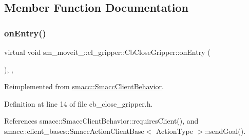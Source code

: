 \subsection{Member Function Documentation}
\mbox{\label{classsm__moveit__2_1_1cl__gripper_1_1CbCloseGripper_aa2b903fc41ba2aecdb00d5f1804cfb75}} 
\subsubsection{\texorpdfstring{on\+Entry()}{onEntry()}}
{\footnotesize\ttfamily virtual void sm\+\_\+moveit\+\_\+::cl\+\_\+gripper\+::\+Cb\+Close\+Gripper\+::on\+Entry (\begin{DoxyParamCaption}{ }\end{DoxyParamCaption})\hspace{0.3cm}{\ttfamily [inline]}, {\ttfamily [override]}, {\ttfamily [virtual]}}



Reimplemented from \hyperlink{classsmacc_1_1SmaccClientBehavior_a7962382f93987c720ad432fef55b123f}{smacc\+::\+Smacc\+Client\+Behavior}.



Definition at line 14 of file cb\+\_\+close\+\_\+gripper.\+h.



References smacc\+::\+Smacc\+Client\+Behavior\+::requires\+Client(), and smacc\+::client\+\_\+bases\+::\+Smacc\+Action\+Client\+Base$<$ Action\+Type $>$\+::send\+Goal().



